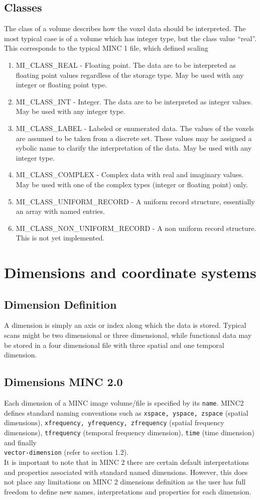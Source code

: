 \documentclass{article}
\begin{document}
\subsection{Classes}
The class of a volume describes how the voxel data should be interpreted.
The most typical case is of a volume which has integer type, but the class
value ``real''.  This corresponds to the typical MINC 1 file, which defined
scaling
\begin{enumerate}
\item MI\_CLASS\_REAL - Floating point.  The data are to be
interpreted as floating point values regardless of the storage type.
May be used with any integer or floating point type.
\item MI\_CLASS\_INT - Integer.  The data are to be interpreted as integer
values.  May be used with any integer type.
\item MI\_CLASS\_LABEL - Labeled or enumerated data.  The values of
the voxels are assumed to be taken from a discrete set.  These values
may be assigned a sybolic name to clarify the interpretation of the
data.  May be used with any integer type.
\item MI\_CLASS\_COMPLEX - Complex data with real and imaginary values. May be used with one of the complex types (integer or floating point) only.
\item MI\_CLASS\_UNIFORM\_RECORD - A uniform record structure, essentially an
array with named entries.
\item MI\_CLASS\_NON\_UNIFORM\_RECORD - A non uniform record structure.  This
is not yet implemented.
\end{enumerate}
\section{Dimensions and coordinate systems}
\subsection{Dimension Definition}
A dimension is simply an axis or index along which the data is stored.  
Typical scans might be two dimensional or three dimensional, while functional 
data may be stored in a four dimensional file with three spatial and one temporal 
dimension.
\subsection{Dimensions MINC 2.0}
Each dimension of a MINC image volume/file is specified by its {\tt name}. MINC2 defines
standard naming conventions such as {\tt xspace, yspace, zspace} (spatial 
dimensions), {\tt xfrequency, yfrequency, zfrequency}
(spatial frequency dimensions), {\tt tfrequency} (temporal frequency dimension), {\tt time} 
(time dimension) and finally \\
{\tt vector-dimension} (refer to section 1.2). \\
It is important to note that in MINC 2 there are certain default interpretations and properties 
associated with standard named dimensions. However, this does not place 
any limitations on MINC 2 dimensions definition as the user has full freedom to define new names, 
interpretations and properties for each dimension.
\end{document}
